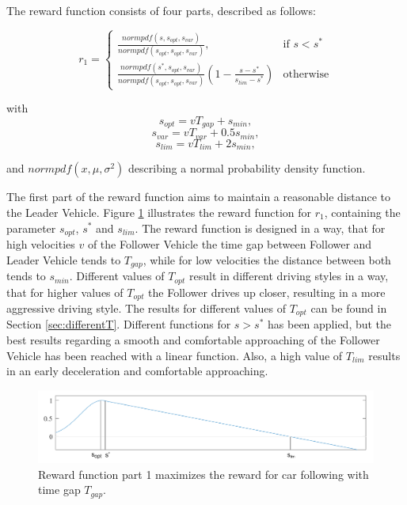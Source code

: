 \documentclass[review]{elsarticle}
\begin{document}
The reward function consists of four parts, described as follows:


\begin{equation}
\label{eq:r1}
r_1  = 
\begin{cases}
\frac{normpdf(s,  s_{opt},  s_{var})}{normpdf( s_{opt},  s_{opt},  s_{var})},& \text{if } s < s^*\\
\frac{normpdf(s^*,  s_{opt},  s_{var})}{normpdf( s_{opt},  s_{opt},  s_{var})} (1-\frac{s-s^*}{s_{lim} - s^*})              & \text{otherwise}
\end{cases}
\end{equation}



with
\begin{equation}
\label{eq:r11}
s_{opt} = vT_{gap} + s_{min},
\end{equation}
\begin{equation}
\label{eq:r12}
s_{var} = vT_{var} + 0.5s_{min},
\end{equation}
\begin{equation}
\label{eq:r13}
s_{lim} = vT_{lim} + 2s_{min},
\end{equation}

and $normpdf(x,\mu,\sigma^2)$ describing a normal probability density function.

The first part of the reward function aims to maintain a reasonable distance to the Leader Vehicle. Figure \ref{fig:RewardFunc1} illustrates the reward function for $r_1$, containing the parameter $s_{opt}$, $s^*$ and $s_{lim}$. The reward function is designed in a way, that for high velocities $v$ of the Follower Vehicle the time gap between Follower and Leader Vehicle tends to $T_{gap}$, while for low velocities the distance between both tends to $s_{min}$. Different values of $T_{opt}$ result in different driving styles in a way, that for higher values of $T_{opt}$ the Follower drives up closer, resulting in a more aggressive driving style. The results for different values of $T_{opt}$ can be found in Section \ref{sec:differentT}. Different functions for $ s > s^*$ has been applied, but the best results regarding a smooth and comfortable approaching of the Follower Vehicle has been reached with a linear function. Also, a high value of $T_{lim}$ results in an early deceleration and comfortable approaching. 

\begin{figure}
	\centering
	\includegraphics[width=12cm]{images/RewardFunc1}
	\caption{Reward function part 1 maximizes the reward for car following with time gap $T_{gap}$.}
	\label{fig:RewardFunc1}
\end{figure}
\end{document}
